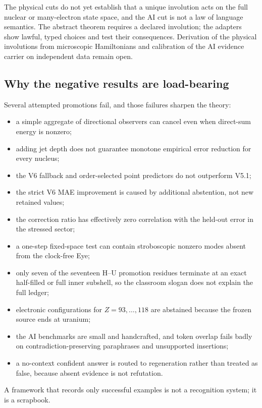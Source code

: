 The physical cuts do not yet establish that a unique involution acts on the full nuclear or many-electron state space, and the AI cut is not a law of language semantics. The abstract theorem requires a declared involution; the adapters show lawful, typed choices and test their consequences. Derivation of the physical involutions from microscopic Hamiltonians and calibration of the AI evidence carrier on independent data remain open.

\subsection{Why the negative results are load-bearing}

Several attempted promotions fail, and those failures sharpen the theory:
\begin{itemize}
\item a simple aggregate of directional observers can cancel even when direct-sum energy is nonzero;
\item adding jet depth does not guarantee monotone empirical error reduction for every nucleus;
\item the V6 fallback and order-selected point predictors do not outperform V5.1;
\item the strict V6 MAE improvement is caused by additional abstention, not new retained values;
\item the correction ratio has effectively zero correlation with the held-out error in the stressed sector;
\item a one-step fixed-space test can contain stroboscopic nonzero modes absent from the clock-free Eye;
\item only seven of the seventeen H--U promotion residues terminate at an exact half-filled or full inner subshell, so the classroom slogan does not explain the full ledger;
\item electronic configurations for $Z=93,\ldots,118$ are abstained because the frozen source ends at uranium;
\item the AI benchmarks are small and handcrafted, and token overlap fails badly on contradiction-preserving paraphrases and unsupported insertions;
\item a no-context confident answer is routed to regeneration rather than treated as false, because absent evidence is not refutation.
\end{itemize}
A framework that records only successful examples is not a recognition system; it is a scrapbook.

